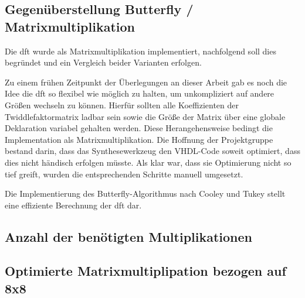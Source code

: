 \subsection{Gegenüberstellung Butterfly / Matrixmultiplikation} 
  Die \gls{dft} wurde als Matrixmultiplikation implementiert, nachfolgend soll dies begründet und ein Vergleich beider Varianten erfolgen.
  
  Zu einem frühen Zeitpunkt der Überlegungen 
  an dieser Arbeit gab es noch die Idee die \gls{dft} so flexibel wie möglich zu halten, um unkompliziert auf andere Größen wechseln zu können.
  Hierfür sollten alle Koeffizienten der Twiddlefaktormatrix ladbar sein sowie die Größe der Matrix über eine globale Deklaration variabel gehalten werden.
  Diese Herangehensweise bedingt die Implementation als Matrixmultiplikation. Die Hoffnung der Projektgruppe bestand darin, dass das Synthesewerkzeug den 
  VHDL-Code soweit optimiert, dass dies nicht händisch erfolgen müsste.
  Als klar war, dass sie Optimierung nicht so tief greift, wurden die entsprechenden Schritte manuell umgesetzt. 
  
  Die Implementierung des Butterfly-Algorithmus nach Cooley und Tukey stellt eine effiziente Berechnung der \gls{dft} dar. 
  
  
 \subsection{Anzahl der benötigten Multiplikationen}
 \subsection{Optimierte Matrixmultiplipation bezogen auf 8x8}